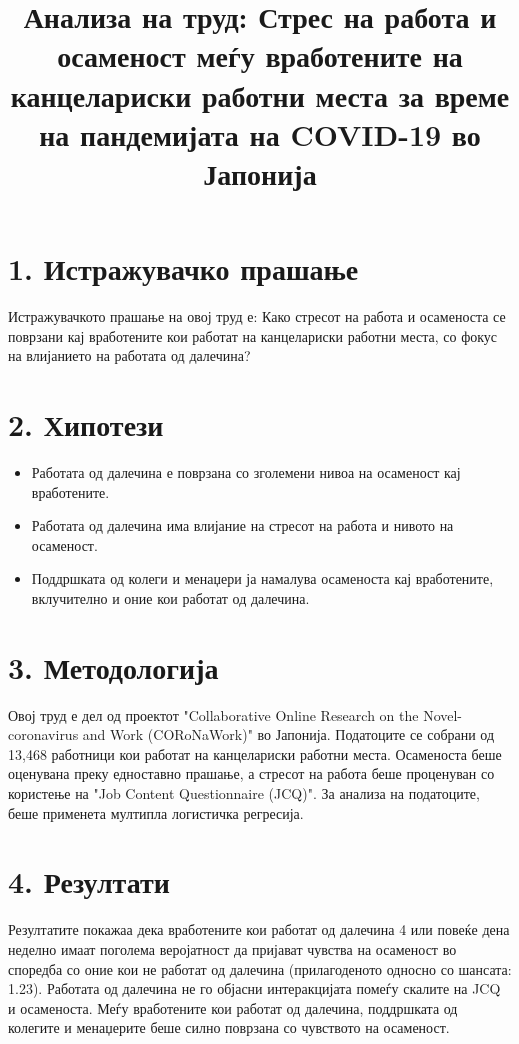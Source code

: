\documentclass[12pt]{article}
\title{Анализа на труд: Стрес на работа и осаменост меѓу вработените на канцелариски работни места за време на пандемијата на COVID-19 во Јапонија}
\author{}
\date{}
\begin{document}
\maketitle

\section*{1. Истражувачко прашање}
Истражувачкото прашање на овој труд е: Како стресот на работа и осаменоста се поврзани кај вработените кои работат на канцелариски работни места, со фокус на влијанието на работата од далечина?

\section*{2. Хипотези}
\begin{itemize}
    \item Работата од далечина е поврзана со зголемени нивоа на осаменост кај вработените.
    \item Работата од далечина има влијание на стресот на работа и нивото на осаменост.
    \item Поддршката од колеги и менаџери ја намалува осаменоста кај вработените, вклучително и оние кои работат од далечина.
\end{itemize}

\section*{3. Методологија}
Овој труд е дел од проектот "Collaborative Online Research on the Novel-coronavirus and Work (CORoNaWork)" во Јапонија. Податоците се собрани од 13,468 работници кои работат на канцелариски работни места. Осаменоста беше оценувана преку едноставно прашање, а стресот на работа беше проценуван со користење на "Job Content Questionnaire (JCQ)". За анализа на податоците, беше применета мултипла логистичка регресија.

\section*{4. Резултати}
Резултатите покажаа дека вработените кои работат од далечина 4 или повеќе дена неделно имаат поголема веројатност да пријават чувства на осаменост во споредба со оние кои не работат од далечина (прилагоденото односно со шансата: 1.23). Работата од далечина не го објасни интеракцијата помеѓу скалите на JCQ и осаменоста. Меѓу вработените кои работат од далечина, поддршката од колегите и менаџерите беше силно поврзана со чувството на осаменост.
\end{document}
